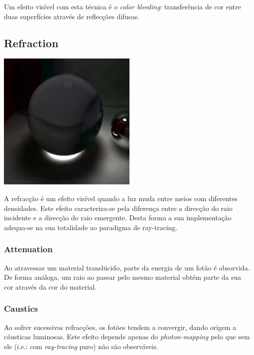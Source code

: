 \documentclass[a4paper]{article}
\begin{document}
\indent Um efeito visível com esta técnica é o \emph{color bleeding}: transferência de cor entre duas superfícies
através de reflecções difusas.

\cleardoublepage
\subsection{Refraction}
\begin{center}
	\includegraphics[scale=0.50]{images/caustics.png}
	\label{fig:caustics}
\end{center}

\indent A refracção é um efeito visível quando a luz muda entre meios com diferentes densidades.
Este efeito caracteriza-se pela diferença entre a direcção do raio incidente e a direcção do raio emergente. 
Desta forma a sua implementação adequa-se na sua totalidade ao paradigma de ray-tracing.

\subsubsection{Attenuation}
\indent \indent Ao atravessar um material translúcido, parte da energia de um fotão é absorvida. De forma análoga,
um raio ao passar pelo mesmo material obtém parte da sua cor através da cor do material.

\subsubsection{Caustics}
\indent \indent Ao sofrer sucessivas refracções, os fotões tendem a convergir, dando origem a cáusticas luminosas.
Este efeito depende apenas do \emph{photon-mapping} pelo que sem ele (i.e.: com \emph{ray-tracing} puro)
não são observáveis.

\cleardoublepage
\end{document}
